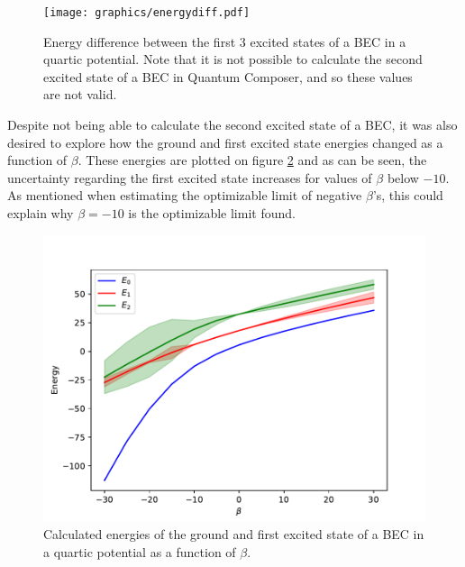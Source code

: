 \documentclass[aps,pra,reprint,superscriptaddress]{revtex4-1}
\begin{document}
\begin{figure}
	\texttt{[image: graphics/energydiff.pdf]}
	\caption{Energy difference between the first 3 excited states of a BEC in a quartic potential. Note that it is not possible to calculate the second excited state of a BEC in Quantum Composer, and so these values are not valid.}
	\label{fig:energyDiff}
\end{figure}

Despite not being able to calculate the second excited state of a BEC, it was also desired to explore how the ground and first excited state energies changed as a function of $\beta$. These energies are plotted on figure \ref{fig:energyLevels} and as can be seen, the uncertainty regarding the first excited state increases for values of $\beta$ below $-10$. As mentioned when estimating the optimizable limit of negative $\beta$'s, this could explain why $\beta=-10$ is the optimizable limit found.\\

\begin{figure}
	\includegraphics[width=\columnwidth]{graphics/energylevels.pdf}
	\caption{Calculated energies of the ground and first excited state of a BEC in a quartic potential as a function of $\beta$.}
	\label{fig:energyLevels}
\end{figure}
\end{document}

